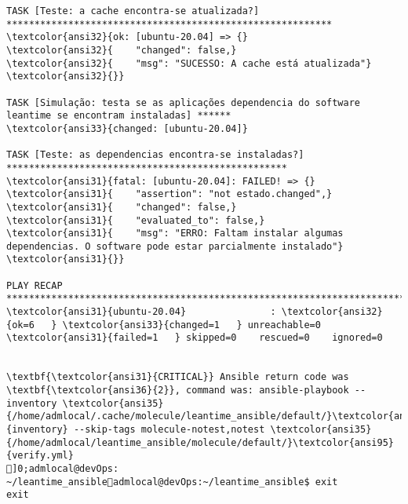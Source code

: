 \documentclass{scrartcl}
\begin{document}
\begin{Verbatim}
TASK [Teste: a cache encontra-se atualizada?] **********************************************************
\textcolor{ansi32}{ok: [ubuntu-20.04] => {}
\textcolor{ansi32}{    "changed": false,}
\textcolor{ansi32}{    "msg": "SUCESSO: A cache está atualizada"}
\textcolor{ansi32}{}}

TASK [Simulação: testa se as aplicações dependencia do software leantime se encontram instaladas] ******
\textcolor{ansi33}{changed: [ubuntu-20.04]}

TASK [Teste: as dependencias encontra-se instaladas?] **************************************************
\textcolor{ansi31}{fatal: [ubuntu-20.04]: FAILED! => {}
\textcolor{ansi31}{    "assertion": "not estado.changed",}
\textcolor{ansi31}{    "changed": false,}
\textcolor{ansi31}{    "evaluated_to": false,}
\textcolor{ansi31}{    "msg": "ERRO: Faltam instalar algumas dependencias. O software pode estar parcialmente instalado"}
\textcolor{ansi31}{}}

PLAY RECAP *********************************************************************************************
\textcolor{ansi31}{ubuntu-20.04}               : \textcolor{ansi32}{ok=6   } \textcolor{ansi33}{changed=1   } unreachable=0    \textcolor{ansi31}{failed=1   } skipped=0    rescued=0    ignored=0


\textbf{\textcolor{ansi31}{CRITICAL}} Ansible return code was \textbf{\textcolor{ansi36}{2}}, command was: ansible-playbook --inventory \textcolor{ansi35}{/home/admlocal/.cache/molecule/leantime_ansible/default/}\textcolor{ansi95}{inventory} --skip-tags molecule-notest,notest \textcolor{ansi35}{/home/admlocal/leantime_ansible/molecule/default/}\textcolor{ansi95}{verify.yml}
]0;admlocal@devOps: ~/leantime_ansibleadmlocal@devOps:~/leantime_ansible$ exit
exit

\end{Verbatim}
\end{document}
